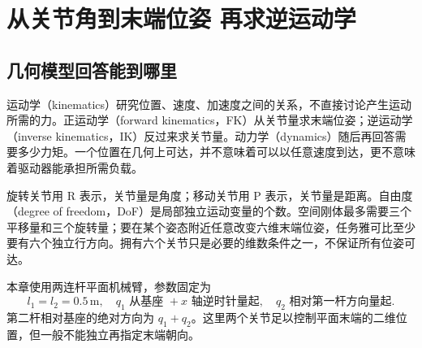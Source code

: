\chapter{从关节角到末端位姿 再求逆运动学}\label{ch:kinematics}
\section{几何模型回答能到哪里}
运动学（kinematics）研究位置、速度、加速度之间的关系，不直接讨论产生运动所需的力。正运动学（forward kinematics，FK）从关节量求末端位姿；逆运动学（inverse kinematics，IK）反过来求关节量。动力学（dynamics）随后再回答需要多少力矩。一个位置在几何上可达，并不意味着可以以任意速度到达，更不意味着驱动器能承担所需负载。

旋转关节用 R 表示，关节量是角度；移动关节用 P 表示，关节量是距离。自由度（degree of freedom，DoF）是局部独立运动变量的个数。空间刚体最多需要三个平移量和三个旋转量；要在某个姿态附近任意改变六维末端位姿，任务雅可比至少要有六个独立行方向。拥有六个关节只是必要的维数条件之一，不保证所有位姿可达。

本章使用两连杆平面机械臂，参数固定为
\begin{equation}
 l_1=l_2=0.5\,\mathrm m,
 \quad q_1\text{ 从基座 }+x\text{ 轴逆时针量起},
 \quad q_2\text{ 相对第一杆方向量起}.
\end{equation}
第二杆相对基座的绝对方向为 $q_1+q_2$。这里两个关节足以控制平面末端的二维位置，但一般不能独立再指定末端朝向。

